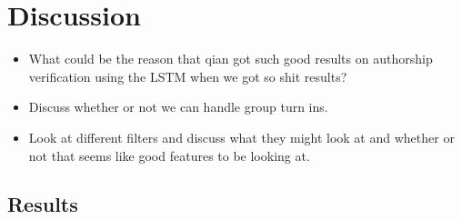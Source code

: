 \section{Discussion} \label{sec:discussion}

\begin{itemize}

    \item

        What could be the reason that qian got such good results on authorship
        verification using the LSTM when we got so shit results?

    \item

        Discuss whether or not we can handle group turn ins.

    \item

        Look at different filters and discuss what they might look at and
        whether or not that seems like good features to be looking at.

\end{itemize}


\subsection{Results}


